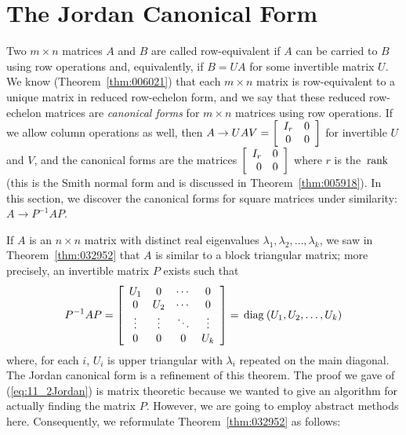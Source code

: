 \section{The Jordan Canonical Form}
\label{sec:11_2}

Two $m \times n$ matrices $A$ and $B$ are called row-equivalent if $A$ can be carried to $B$ using row operations and, equivalently, if $B = UA$ for some invertible matrix $U$. We know (Theorem~\ref{thm:006021}) that each $m \times n$ matrix is row-equivalent to a unique matrix in reduced row-echelon form, and we say that these reduced row-echelon matrices are \textit{canonical forms} for $m \times n$ matrices using row operations. If we allow column operations as well, then $A \to UAV = \left[ \begin{array}{cc}
I_r & 0 \\
0 & 0
\end{array} \right]$
 for invertible $U$ and $V$, and the canonical forms are the matrices $\left[ \begin{array}{rr}
 I_r & 0 \\
 0 & 0
 \end{array} \right]$
 where $r$ is the $\thinspace\operatorname{rank\medspace}$ (this is the Smith normal form and is discussed in Theorem~\ref{thm:005918}). In this section, we discover the canonical forms for square matrices under similarity: $A \to P^{-1}AP$.


If $A$ is an $n \times n$ matrix with distinct real eigenvalues $\lambda_{1}, \lambda_{2}, \dots, \lambda_{k}$, we saw in Theorem~\ref{thm:032952} that $A$ is similar to a block triangular matrix; more precisely, an invertible matrix $P$ exists such that
\begin{equation}\label{eq:11_2Jordan}
P^{-1}AP = \left[ \begin{array}{cccc}
U_1 & 0 & \cdots & 0 \\
0 & U_2 & \cdots & 0 \\
\vdots & \vdots & \ddots & \vdots \\
0 & 0 & 0 & U_k
\end{array} \right] = \thinspace\operatorname{diag\medspace}(U_1, U_2, \dots, U_k)
\end{equation}
where, for each $i$, $U_{i}$ is upper triangular with $\lambda_{i}$ repeated on the main diagonal. The Jordan canonical form is a refinement of this theorem. The proof we gave of (\ref{eq:11_2Jordan}) is matrix theoretic because we wanted to give an algorithm for actually finding the matrix $P$. However, we are going to employ abstract methods here. Consequently, we reformulate Theorem~\ref{thm:032952} as follows:


